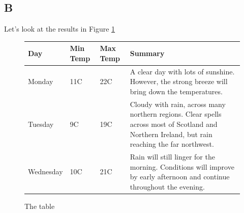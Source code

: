 \documentclass[11pt,a4paper]{article}
\begin{document}
\subsection{B}
Let's look at the results in Figure \ref{tab:first}
\begin{figure}[!h]
\centering
    \begin{tabular}{ | l | l | l | p{5cm} |}
        \hline
            Day & Min Temp & Max Temp & Summary \\ \hline
            Monday & 11C & 22C & A clear day with lots of sunshine.  
            However, the strong breeze will bring down the temperatures. \\ \hline
            Tuesday & 9C & 19C & Cloudy with rain, across many northern regions. Clear spells
            across most of Scotland and Northern Ireland,
            but rain reaching the far northwest. \\ \hline
            Wednesday & 10C & 21C & Rain will still linger for the morning.
            Conditions will improve by early afternoon and continue
            throughout the evening. \\
        \hline
    \end{tabular}
\caption{The table}
\label{tab:first}
\end{figure}
\end{document}
